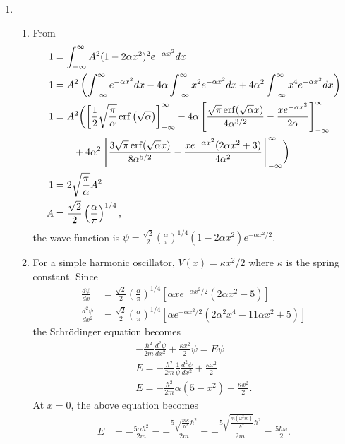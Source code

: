 \documentclass[a4paper,12pt]{article}
\begin{document}
\begin{enumerate}
    \item
        \begin{enumerate}
            \item
                From
                \begin{align*}
                    1 &= \int_{-\infty}^\infty A^2 (1 - 2\alpha x^2)^2 e^{-\alpha x^2} dx \\
                    1 &= A^2 \left( \int_{-\infty}^\infty e^{-\alpha x^2} dx - 4\alpha \int_{-\infty}^\infty x^2 e^{-\alpha x^2} dx + 4\alpha^2 \int_{-\infty}^\infty x^4 e^{-\alpha x^2} dx \right) \\
                    1 &= A^2 \biggl( \left[ \frac{1}{2} \sqrt{ \frac{\pi}{\alpha}} \erf \left( \sqrt{\alpha} \right) \right]_{-\infty}^\infty - 4\alpha \left[ \frac{\sqrt{\pi} \erf(\sqrt{\alpha} x)}{4 \alpha^{3/2}} - \frac{xe^{-\alpha x^2}}{2 \alpha} \right]_{-\infty}^\infty \\
                    &\qquad + 4\alpha^2 \left[ \frac{3 \sqrt{\pi} \erf(\sqrt{\alpha} x)}{8 \alpha^{5/2}} - \frac{xe^{-\alpha x^2} (2 \alpha x^2 + 3)}{4 \alpha^2} \right]_{-\infty}^\infty \biggr) \\
                    1 &= 2 \sqrt{\frac{\pi}{\alpha}} A^2 \\
                    A &= \frac{\sqrt{2}}{2} \left( \frac{\alpha}{\pi} \right)^{1/4},
                \end{align*}
                the wave function is $\psi = \frac{\sqrt{2}}{2} \left( \frac{\alpha}{\pi} \right)^{1/4} (1 - 2\alpha x^2) e^{-\alpha x^2 / 2}$.

            \item
                For a simple harmonic oscillator, $V(x) = \kappa x^2 / 2$ where $\kappa$ is the spring constant. Since
                \begin{align*}
                    \frac{d \psi}{dx} &= \frac{\sqrt{2}}{2} \left( \frac{\alpha}{\pi} \right)^{1/4} \left[ \alpha x e^{-\alpha x^2 / 2} (2 \alpha x^2 - 5) \right] \\
                    \frac{d^2 \psi}{dx^2} &= \frac{\sqrt{2}}{2} \left( \frac{\alpha}{\pi} \right)^{1/4} \left[ \alpha e^{-\alpha x^2 / 2} (2 \alpha^2 x^4 - 11 \alpha x^2 + 5) \right]
                \end{align*}
                the Schr\"odinger equation becomes
                \begin{gather*}
                    -\frac{\hbar^2}{2m} \frac{d^2 \psi}{dx^2} + \frac{\kappa x^2}{2} \psi = E \psi \\
                    E = -\frac{\hbar^2}{2m} \frac{1}{\psi} \frac{d^2 \psi}{dx^2} + \frac{\kappa x^2}{2} \\
                    E = -\frac{\hbar^2}{2m} \alpha(5 - x^2) + \frac{\kappa x^2}{2}.
                \end{gather*}
                At $x = 0$, the above equation becomes
                \begin{align*}
                    E &= -\frac{5 \alpha \hbar^2}{2m} = -\frac{5 \sqrt{\frac{m \kappa}{\hbar^2}} \hbar^2}{2m} = -\frac{5 \sqrt{\frac{m (\omega^2 m)}{\hbar^2}} \hbar^2}{2m} = \frac{5 \hbar \omega}{2}.
                \end{align*}


\end{enumerate}
\end{enumerate}
\end{document}

